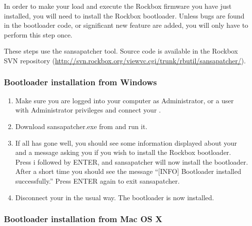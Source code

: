 
In order to make your \playertype{} load and execute the Rockbox firmware you
have just installed, you will need to install the Rockbox
bootloader. Unless bugs are found in the bootloader code, or
significant new feature are added, you will only have to perform this
step once.

These steps use the sansapatcher tool. Source code is available in the Rockbox
SVN repository (\url{http://svn.rockbox.org/viewvc.cgi/trunk/rbutil/sansapatcher/}).

\subsubsection{Bootloader installation from Windows}

\begin{enumerate}

\item Make sure you are logged into your computer as Administrator, or a 
user with Administrator privileges and connect your \dap{}.

\item Download sansapatcher.exe from 
and run it.

\item If all has gone well, you should see some information displayed about
your \playertype{} and a message asking you if you wish to install the Rockbox
bootloader. Press i followed by ENTER, and sansapatcher will now
install the bootloader. After a short time you should see the message
``[INFO] Bootloader installed successfully.'' Press ENTER again to exit
sansapatcher.

\item Disconnect your \dap{} in the usual way. The bootloader is now installed. 

\end{enumerate}

\subsubsection{Bootloader installation from Mac OS X}

